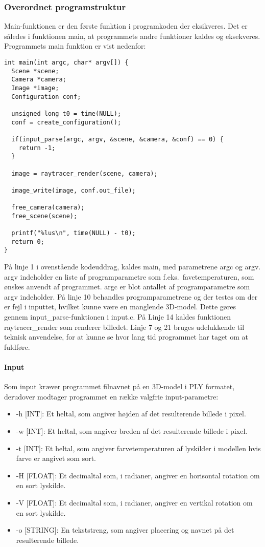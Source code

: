\subsubsection{Overordnet programstruktur}
Main-funktionen er den første funktion i programkoden der eksikveres. Det er således i funktionen main, at programmets andre funktioner kaldes og eksekveres. Programmets main funktion er vist nedenfor:

\begin{lstlisting}[style=Cstyle, caption=Main]
int main(int argc, char* argv[]) {
  Scene *scene;
  Camera *camera;
  Image *image;
  Configuration conf;

  unsigned long t0 = time(NULL);
  conf = create_configuration();
  
  if(input_parse(argc, argv, &scene, &camera, &conf) == 0) {
    return -1;
  }
  
  image = raytracer_render(scene, camera);
  
  image_write(image, conf.out_file);

  free_camera(camera);
  free_scene(scene);
  
  printf("%lus\n", time(NULL) - t0);
  return 0;
}
\end{lstlisting}

På linje 1 i ovenstående kodeuddrag, kaldes main, med parametrene argc og argv. argv indeholder en liste af programparametre som f.eks.\ favetemperaturen, som ønskes anvendt af programmet. argc er blot antallet af programparametre som argv indeholder. På linje 10 behandles programparametrene og der testes om der er fejl i inputtet, hvilket kunne være en manglende 3D-model. Dette gøres gennem input\_parse-funktionen i input.c. På Linje 14 kaldes funktionen raytracer\_render som renderer billedet. Linje 7 og 21 bruges udelukkende til teknisk anvendelse, for at kunne se hvor lang tid programmet har taget om at fuldføre.

\paragraph{Input}
Som input kræver programmet filnavnet på en 3D-model i PLY formatet, derudover modtager programmet en række valgfrie input-parametre:
\begin{itemize}
  \item -h [INT]: Et heltal, som angiver højden af det resulterende billede i pixel.
  \item -w [INT]: Et heltal, som angiver breden af det resulterende billede i pixel.
  \item -t [INT]: Et heltal, som angiver farvetemperaturen af lyskilder i modellen hvis farve er angivet som sort.
  \item -H [FLOAT]: Et decimaltal som, i radianer, angiver en horisontal rotation om en sort lyskilde.
  \item -V [FLOAT]: Et decimaltal som, i radianer, angiver en vertikal rotation om en sort lyskilde.
  \item -o [STRING]: En tekststreng, som angiver placering og navnet på det resulterende billede.
\end{itemize}

